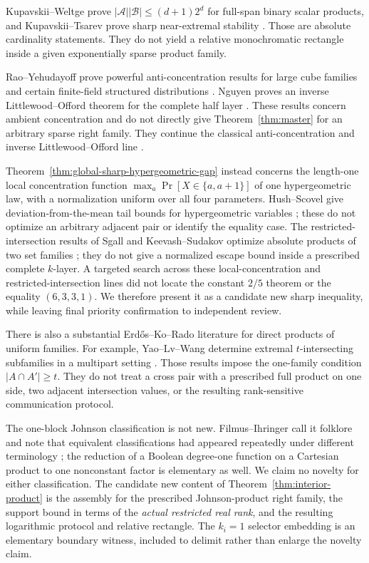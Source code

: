 \documentclass[11pt]{article}
\theoremstyle{definition}
\theoremstyle{remark}
\newcommand{\cA}{\mathcal A}
\newcommand{\cB}{\mathcal B}
\newcommand{\1}{\mathbf 1}
\begin{document}
Kupavskii--Weltge prove
$|\cA||\cB|\le(d+1)2^d$ for full-span binary scalar products, and
Kupavskii--Tsarev prove sharp near-extremal stability
\cite{KupavskiiWeltge,KupavskiiTsarev}.  Those are absolute cardinality
statements.  They do not yield a relative monochromatic rectangle inside a
given exponentially sparse product family.

Rao--Yehudayoff prove powerful anti-concentration results for large cube
families and certain finite-field structured distributions
\cite{RaoYehudayoff}.  Nguyen proves an inverse Littlewood--Offord theorem for
the complete half layer \cite{NguyenCombinatorial}.  These results concern
ambient concentration and do not directly give Theorem~\ref{thm:master} for
an arbitrary sparse right family.
They continue the classical anti-concentration and inverse
Littlewood--Offord line \cite{Erdos,TaoVu,NguyenVu}.

Theorem~\ref{thm:global-sharp-hypergeometric-gap} instead concerns the
length-one local concentration function
$\max_a\Pr[X\in\{a,a+1\}]$ of one hypergeometric law, with a
normalization uniform over all four parameters.  Hush--Scovel give
deviation-from-the-mean tail bounds for hypergeometric variables
\cite{HushScovel}; these do not optimize an arbitrary adjacent pair or
identify the equality case.  The restricted-intersection results of Sgall
and Keevash--Sudakov optimize absolute products of two set families
\cite{SgallRestricted,KeevashSudakovRestricted}; they do not give a
normalized escape bound inside a prescribed complete $k$-layer.  A targeted
search across these local-concentration and restricted-intersection lines
did not locate the constant $2/5$ theorem or the equality
$(6,3,3,1)$.  We therefore present it as a candidate new sharp inequality,
while leaving final priority confirmation to independent review.

There is also a substantial Erd\H{o}s--Ko--Rado literature for direct
products of uniform families.  For example, Yao--Lv--Wang determine extremal
$t$-intersecting subfamilies in a multipart setting \cite{YaoLvWang}.  Those
results impose the one-family condition $|A\cap A'|\ge t$.  They do not treat
a cross pair with a prescribed full product on one side, two adjacent
intersection values, or the resulting rank-sensitive communication protocol.

The one-block Johnson classification is not new.  Filmus--Ihringer call it
folklore and note that equivalent classifications had appeared repeatedly
under different terminology \cite[Theorem~1.2]{FilmusIhringer}; the reduction
of a Boolean degree-one function on a Cartesian product to one nonconstant
factor is elementary as well.  We claim no novelty for either classification.
The candidate new content of Theorem~\ref{thm:interior-product} is the
assembly for the prescribed Johnson-product right family, the support bound
in terms of the \emph{actual restricted real rank}, and the resulting
logarithmic protocol and relative rectangle.  The $k_i=1$ selector embedding
is an elementary boundary witness, included to delimit rather than enlarge
the novelty claim.
\end{document}
